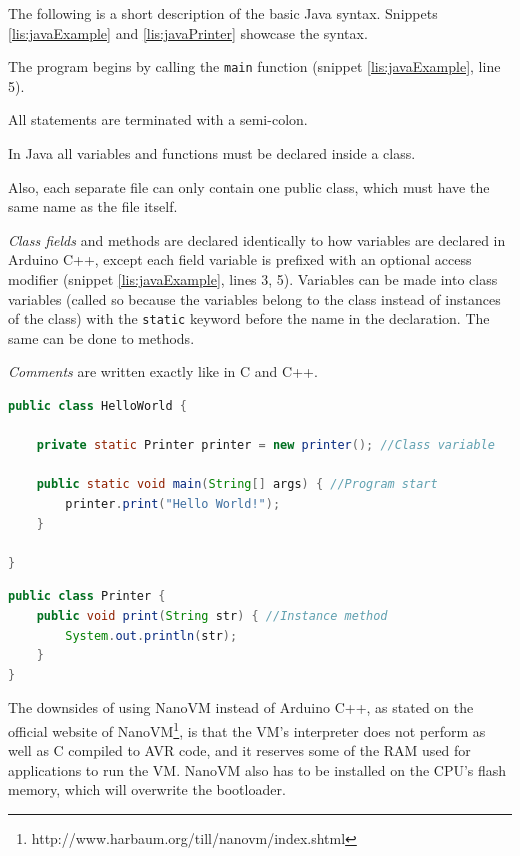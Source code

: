 The following is a short description of the basic Java syntax. 
Snippets \ref{lis:javaExample} and \ref{lis:javaPrinter} showcase the syntax.

The program begins by calling the \texttt{main} function (snippet \ref{lis:javaExample}, line 5).

All statements are terminated with a semi-colon.

In Java all variables and functions must be declared inside a class.

Also, each separate file can only contain one public class, which must have the same name as the file itself. 

\textit{Class fields} and methods are declared identically to how variables are declared in Arduino C++, except each field variable is prefixed with an optional access modifier (snippet \ref{lis:javaExample}, lines 3, 5).
Variables can be made into class variables (called so because the variables belong to the class instead of instances of the class) with the \texttt{static} keyword before the name in the declaration.
The same can be done to methods.

\textit{Comments} are written exactly like in C and C++.

\begin{lstlisting}[language=Java,label=lis:javaExample,caption=An example program written in Java.,firstnumber=1]
public class HelloWorld {

	private static Printer printer = new printer(); //Class variable
	
	public static void main(String[] args) { //Program start
		printer.print("Hello World!");
	}
	
}
\end{lstlisting}

\begin{lstlisting}[language=Java,label=lis:javaPrinter,caption=Printer class with one method written in Java.,firstnumber=1]
public class Printer {
	public void print(String str) { //Instance method
		System.out.println(str);
	}
}
\end{lstlisting}

The downsides of using NanoVM instead of Arduino C++, as stated on the official website of NanoVM\footnote{http://www.harbaum.org/till/nanovm/index.shtml}, is that the VM's interpreter does not perform as well as C compiled to AVR code, and it reserves some of the RAM used for applications to run the VM.
NanoVM also has to be installed on the CPU's flash memory, which will overwrite the bootloader.

